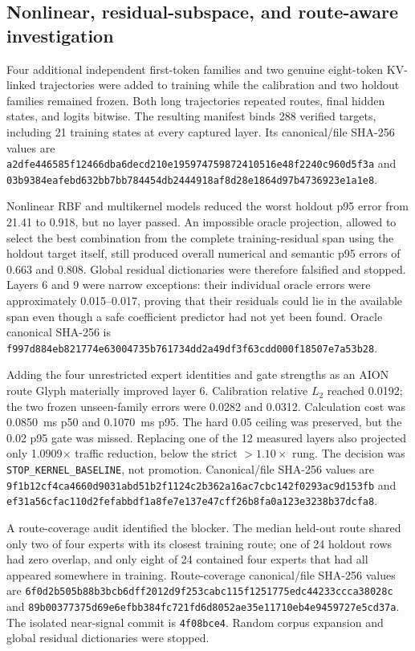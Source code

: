 \subsection{Nonlinear, residual-subspace, and route-aware investigation}

Four additional independent first-token families and two genuine eight-token
KV-linked trajectories were added to training while the calibration and two
holdout families remained frozen.  Both long trajectories repeated routes,
final hidden states, and logits bitwise.  The resulting manifest binds 288
verified targets, including 21 training states at every captured layer.  Its
canonical/file SHA-256 values are
\texttt{a2dfe446585f12466dba6decd210e195974759872410516e48f2240c960d5f3a}
and
\texttt{03b9384eafebd632bb7bb784454db2444918af8d28e1864d97b4736923e1a1e8}.

Nonlinear RBF and multikernel models reduced the worst holdout p95 error from
21.41 to 0.918, but no layer passed.  An impossible oracle projection, allowed
to select the best combination from the complete training-residual span using
the holdout target itself, still produced overall numerical and semantic p95
errors of 0.663 and 0.808.  Global residual dictionaries were therefore
falsified and stopped.  Layers 6 and 9 were narrow exceptions: their individual
oracle errors were approximately 0.015--0.017, proving that their residuals
could lie in the available span even though a safe coefficient predictor had
not yet been found.  Oracle canonical SHA-256 is
\texttt{f997d884eb821774e63004735b761734dd2a49df3f63cdd000f18507e7a53b28}.

Adding the four unrestricted expert identities and gate strengths as an AION
route Glyph materially improved layer 6.  Calibration relative $L_2$ reached
0.0192; the two frozen unseen-family errors were 0.0282 and 0.0312.  Calculation
cost was 0.0850~ms p50 and 0.1070~ms p95.  The hard 0.05 ceiling was preserved,
but the 0.02 p95 gate was missed.  Replacing one of the 12 measured layers also
projected only 1.0909$\times$ traffic reduction, below the strict
$>1.10\times$ rung.  The decision was \texttt{STOP\_KERNEL\_BASELINE}, not
promotion.  Canonical/file SHA-256 values are
\texttt{9f1b12cf4ca4660d9031abd51b2f1124c2b362a16ac7cbc142f0293ac9d153fb}
and
\texttt{ef31a56cfac110d2fefabbdf1a8fe7e137e47cff26b8fa0a123e3238b37dcfa8}.

A route-coverage audit identified the blocker.  The median held-out route
shared only two of four experts with its closest training route; one of 24
holdout rows had zero overlap, and only eight of 24 contained four experts that
had all appeared somewhere in training.  Route-coverage canonical/file
SHA-256 values are
\texttt{6f0d2b505b88b3bcb6dff2012d9f253cabc115f1251775edc44233ccca38028c}
and
\texttt{89b00377375d69e6efbb384fc721fd6d8052ae35e11710eb4e9459727e5cd37a}.
The isolated near-signal commit is \texttt{4f08bce4}.  Random corpus expansion
and global residual dictionaries were stopped.

